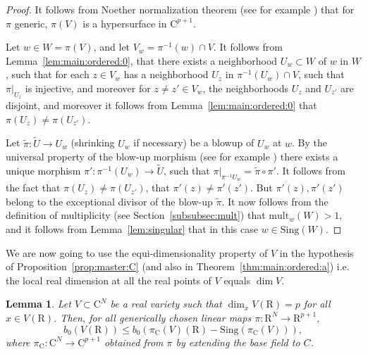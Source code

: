 \documentclass[10pt]{amsart}
\newtheorem{lemma}{Lemma}[section]
\theoremstyle{definition}
\theoremstyle{remark}
\numberwithin{equation}{section}
\newcommand {\R} {\mathrm{R}}
\newcommand {\C}     {\mathrm{C}}
\newcommand{\Sing}{\mathrm{Sing}}
\newcommand{\mult}{\mathrm{mult}}
\begin{document}
\begin{proof}
    It follows from Noether normalization theorem
    (see for example \cite[Theorem 2.2.9]{deJong-Pfister-book})
    that for $\pi$ generic,
    $\pi(V)$ is a hypersurface in $\C^{p+1}$.
    
Let $w \in W = \pi(V)$, and let $V_w = \pi^{-1}(w) \cap V$. 
It follows from Lemma~\ref{lem:main:ordered:0}, that 
there exists a neighborhood $U_w \subset W$ of $w$ in $W$, such that
for each $z \in V_w$ has a neighborhood
$U_{z}$ in  $\pi^{-1}(U_w) \cap V$, such that
$\pi|_{U_z}$ is injective, and moreover 
for $z \neq z' \in V_w$, the neighborhoods 
$U_{z}$ and $U_{z'}$ are disjoint, and moreover it follows from
Lemma~\ref{lem:main:ordered:0} that $\pi(U_z) \neq  \pi(U_{z'})$.

Let $\widetilde{\pi}: \widetilde{U} \rightarrow U_w$ (shrinking $U_w$ if necessary) be a
blowup of $U_w$ at $w$. By the universal property of the blow-up morphism (see for example \cite[Chapter II, Proposition 7.14]{Hartshorne}) there exists a unique morphism $\pi': \pi^{-1}(U_w) \rightarrow \widetilde{U}$, such that
$\pi|_{\pi^{-1}{U_w}} = \widetilde{\pi} \circ \pi'$. It follows from the fact that 
$\pi(U_z) \neq  \pi(U_{z'})$, that $\pi'(z) \neq \pi'(z')$. But $\pi'(z), \pi'(z')$ belong to the exceptional divisor of the blow-up $\widetilde{\pi}$. It now follows from the definition of multiplicity (see Section~\ref{subsubsec:mult})
that 
$\mult_w(W) >1$, and 
it follows from Lemma~\ref{lem:singular} that in this case
$w \in \Sing(W)$.
\end{proof}

We are now going to use the equi-dimensionality property of $V$ 
in the hypothesis of Proposition~\ref{prop:master:C} (and also in Theorem~\ref{thm:main:ordered:a})  i.e.
the local real dimension at all the real points of $V$ equals $\dim V$.

\begin{lemma}
\label{lem:main:ordered:2}
   Let $V \subset \C^N$ be  
   a real variety such that $\dim_x V(\R) = p$ for all $x \in V(\R)$.
   Then, for all generically chosen linear maps
   $\pi:\R^N \rightarrow \R^{p+1}$, 
   \[
        b_0(V(\R)) 
        \leq b_0(\pi_\C(V)(\R) - \Sing(\pi_\C(V))),
   \]
   where $\pi_\C: \C^N \rightarrow \C^{p+1}$ obtained from $\pi$ by 
   extending the base field to $C$.
\end{lemma}
\end{document}
